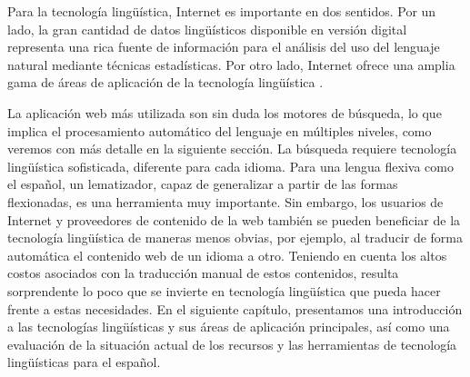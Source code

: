 \begin{multicols}{2}
Para la tecnología lingüística, Internet es importante en dos sentidos. Por un lado, la gran cantidad de datos lingüísticos disponible en versión digital representa una rica fuente de información para el análisis del uso del lenguaje natural mediante técnicas estadísticas. Por otro lado, Internet ofrece una amplia gama de áreas de aplicación de la tecnología lingüística \cite{lenguatec}.

La aplicación web más utilizada son sin duda los motores de búsqueda, lo que implica el procesamiento automático del lenguaje en múltiples niveles, como veremos con más detalle en la siguiente sección. La búsqueda requiere tecnología lingüística sofisticada, diferente para cada idioma. Para una lengua flexiva como el español, un lematizador, capaz de generalizar a partir de las formas flexionadas, es una herramienta muy importante. Sin embargo, los usuarios de Internet y proveedores de contenido de la web también se pueden beneficiar de la tecnología lingüística de maneras menos obvias, por ejemplo, al traducir de forma automática el contenido web de un idioma a otro. Teniendo en cuenta los altos costos asociados con la traducción manual de estos contenidos, resulta sorprendente lo poco que se invierte en tecnología lingüística que pueda hacer frente a estas necesidades. En el siguiente capítulo, presentamos una introducción a las tecnologías lingüísticas y sus áreas de aplicación principales, así como una evaluación de la situación actual de los recursos y las herramientas de tecnología lingüísticas para el español.
\end{multicols}

\clearpage



